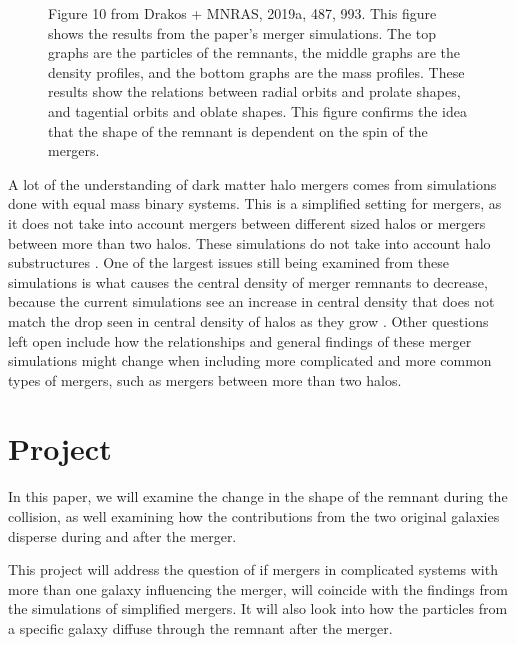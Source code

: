 \documentclass[linenumbers,trackchanges]{aastex7}
\begin{document}
\begin{figure}[ht!]
\caption{Figure 10 from Drakos + MNRAS, 2019a, 487, 993. This figure shows the results from the paper's merger simulations. The top graphs are the particles of the remnants, the middle graphs are the density profiles, and the bottom graphs are the mass profiles. These results show the relations between radial orbits and prolate shapes, and tagential orbits and oblate shapes. This figure confirms the idea that the shape of the remnant is dependent on the spin of the mergers.
\label{fig:general}}
\end{figure}



A lot of the understanding of dark matter halo mergers comes from simulations done with equal mass binary systems. This is a simplified setting for mergers, as it does not take into account mergers between different sized halos or mergers between more than two halos. These simulations do not take into account halo substructures \cite{2019MNRAS.487..993D}. One of the largest issues still being examined from these simulations is what causes the central density of merger remnants to decrease, because the current simulations see an increase in central density that does not match the drop seen in central density of halos as they grow \cite{2019MNRAS.487.1008D}. Other questions left open include how the relationships and general findings of these merger simulations might change when including more complicated and more common types of mergers, such as mergers between more than two halos. 


\section{Project} \label{sec:style}

In this paper, we will examine the change in the shape of the remnant during the collision, as well examining how the contributions from the two original galaxies disperse during and after the merger. 

This project will address the question of if mergers in complicated systems with more than one galaxy influencing the merger, will coincide with the findings from the simulations of simplified mergers. It will also look into how the particles from a specific galaxy diffuse through the remnant after the merger. 
\end{document}
